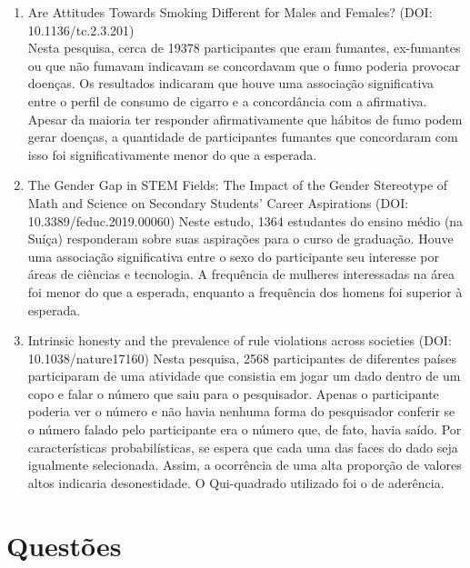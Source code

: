 \documentclass[
]{book}
\begin{document}
\begin{enumerate}
\def\labelenumi{\arabic{enumi}.}
\item
  Are Attitudes Towards Smoking Different for Males and Females? (DOI: 10.1136/tc.2.3.201)\\
  Nesta pesquisa, cerca de 19378 participantes que eram fumantes, ex-fumantes ou que não fumavam indicavam se concordavam que o fumo poderia provocar doenças. Os resultados indicaram que houve uma associação significativa entre o perfil de consumo de cigarro e a concordância com a afirmativa. Apesar da maioria ter responder afirmativamente que hábitos de fumo podem gerar doenças, a quantidade de participantes fumantes que concordaram com isso foi significativamente menor do que a esperada.
\item
  The Gender Gap in STEM Fields: The Impact of the Gender Stereotype of Math and Science on Secondary Students' Career Aspirations (DOI: 10.3389/feduc.2019.00060)
  Neste estudo, 1364 estudantes do ensino médio (na Suíça) responderam sobre suas aspirações para o curso de graduação. Houve uma associação significativa entre o sexo do participante seu interesse por áreas de ciências e tecnologia. A frequência de mulheres interessadas na área foi menor do que a esperada, enquanto a frequência dos homens foi superior à esperada.
\item
  Intrinsic honesty and the prevalence of rule violations across societies (DOI: 10.1038/nature17160)
  Nesta pesquisa, 2568 participantes de diferentes países participaram de uma atividade que consistia em jogar um dado dentro de um copo e falar o número que saiu para o pesquisador. Apenas o participante poderia ver o número e não havia nenhuma forma do pesquisador conferir se o número falado pelo participante era o número que, de fato, havia saído. Por características probabilísticas, se espera que cada uma das faces do dado seja igualmente selecionada. Assim, a ocorrência de uma alta proporção de valores altos indicaria desonestidade. O Qui-quadrado utilizado foi o de aderência.
\end{enumerate}

\hypertarget{questuxf5es-3}{%
\section{Questões}\label{questuxf5es-3}}
\end{document}
